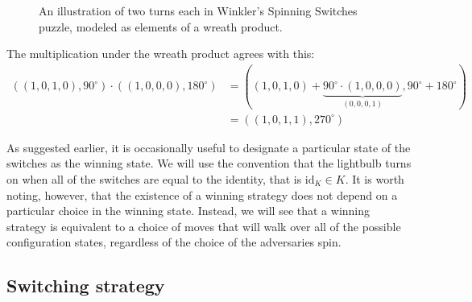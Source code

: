 \begin{example}
\begin{figure}
    \caption[A wreath product interpretation of a spinning switches puzzle.]{
      An illustration of two turns each in Winkler's Spinning Switches puzzle,
      modeled as elements of a wreath product.
    }
    \label{fig:WreathProduct}
  \end{figure}

  The multiplication under the wreath product agrees with this: \begin{align*}
    ((1,0,1,0), 90^\circ) \cdot ((1,0,0,0), 180^\circ)
    &= ((1,0,1,0) + \underbrace{90^\circ \cdot (1,0,0,0)}_{(0,0,0,1)}, 90^\circ + 180^\circ) \\
    &= ((1,0,1,1), 270^\circ)
  \end{align*}
\end{example}

As suggested earlier, it is occasionally useful to designate a particular state
of the switches as the winning state. We will use the
convention that the lightbulb turns on when all of the switches are equal to the
identity, that is $\mathrm{id}_K \in K$.
It is worth noting, however, that the existence of a winning strategy does not
depend on a particular choice in the winning state.
Instead, we will see that a winning strategy is equivalent to a choice of moves
that will walk over all of the possible configuration states, regardless of the
choice of the adversaries spin.

\subsection{Switching strategy}

